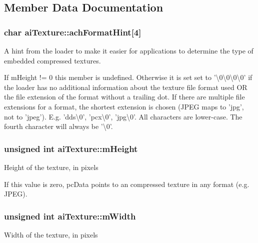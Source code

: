 \subsection{Member Data Documentation}
\hypertarget{structai_texture_aa9f44996acf3b301bfeb4e5348311540}{
\subsubsection[{ach\+Format\+Hint}]{\setlength{\rightskip}{0pt plus 5cm}char ai\+Texture\+::ach\+Format\+Hint\mbox{[}4\mbox{]}}}\label{structai_texture_aa9f44996acf3b301bfeb4e5348311540}
A hint from the loader to make it easier for applications to determine the type of embedded compressed textures.

If m\+Height != 0 this member is undefined. Otherwise it is set set to '\textbackslash{}0\textbackslash{}0\textbackslash{}0\textbackslash{}0' if the loader has no additional information about the texture file format used O\+R the file extension of the format without a trailing dot. If there are multiple file extensions for a format, the shortest extension is chosen (J\+P\+E\+G maps to 'jpg', not to 'jpeg'). E.\+g. 'dds\textbackslash{}0', 'pcx\textbackslash{}0', 'jpg\textbackslash{}0'. All characters are lower-\/case. The fourth character will always be '\textbackslash{}0'. \hypertarget{structai_texture_ac1e2fa6f1f646e9c55e3985d4418a752}{
\subsubsection[{m\+Height}]{\setlength{\rightskip}{0pt plus 5cm}unsigned int ai\+Texture\+::m\+Height}}\label{structai_texture_ac1e2fa6f1f646e9c55e3985d4418a752}
Height of the texture, in pixels

If this value is zero, pc\+Data points to an compressed texture in any format (e.\+g. J\+P\+E\+G). \hypertarget{structai_texture_aaa3ad8cfe44fdc4dea2db91977d92234}{
\subsubsection[{m\+Width}]{\setlength{\rightskip}{0pt plus 5cm}unsigned int ai\+Texture\+::m\+Width}}\label{structai_texture_aaa3ad8cfe44fdc4dea2db91977d92234}
Width of the texture, in pixels

